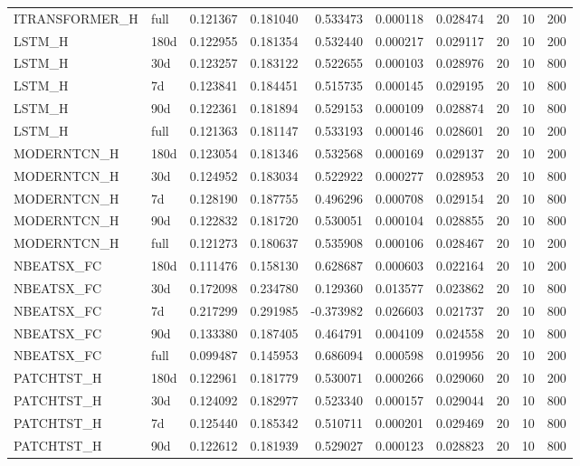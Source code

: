 \begin{tabular}{llrrrrrrrr}
ITRANSFORMER\_H & full & 0.121367 & 0.181040 & 0.533473 & 0.000118 & 0.028474 & 20 & 10 & 200 \\
LSTM\_H & 180d & 0.122955 & 0.181354 & 0.532440 & 0.000217 & 0.029117 & 20 & 10 & 200 \\
LSTM\_H & 30d & 0.123257 & 0.183122 & 0.522655 & 0.000103 & 0.028976 & 20 & 10 & 800 \\
LSTM\_H & 7d & 0.123841 & 0.184451 & 0.515735 & 0.000145 & 0.029195 & 20 & 10 & 800 \\
LSTM\_H & 90d & 0.122361 & 0.181894 & 0.529153 & 0.000109 & 0.028874 & 20 & 10 & 800 \\
LSTM\_H & full & 0.121363 & 0.181147 & 0.533193 & 0.000146 & 0.028601 & 20 & 10 & 200 \\
MODERNTCN\_H & 180d & 0.123054 & 0.181346 & 0.532568 & 0.000169 & 0.029137 & 20 & 10 & 200 \\
MODERNTCN\_H & 30d & 0.124952 & 0.183034 & 0.522922 & 0.000277 & 0.028953 & 20 & 10 & 800 \\
MODERNTCN\_H & 7d & 0.128190 & 0.187755 & 0.496296 & 0.000708 & 0.029154 & 20 & 10 & 800 \\
MODERNTCN\_H & 90d & 0.122832 & 0.181720 & 0.530051 & 0.000104 & 0.028855 & 20 & 10 & 800 \\
MODERNTCN\_H & full & 0.121273 & 0.180637 & 0.535908 & 0.000106 & 0.028467 & 20 & 10 & 200 \\
NBEATSX\_FC & 180d & 0.111476 & 0.158130 & 0.628687 & 0.000603 & 0.022164 & 20 & 10 & 200 \\
NBEATSX\_FC & 30d & 0.172098 & 0.234780 & 0.129360 & 0.013577 & 0.023862 & 20 & 10 & 800 \\
NBEATSX\_FC & 7d & 0.217299 & 0.291985 & -0.373982 & 0.026603 & 0.021737 & 20 & 10 & 800 \\
NBEATSX\_FC & 90d & 0.133380 & 0.187405 & 0.464791 & 0.004109 & 0.024558 & 20 & 10 & 800 \\
NBEATSX\_FC & full & 0.099487 & 0.145953 & 0.686094 & 0.000598 & 0.019956 & 20 & 10 & 200 \\
PATCHTST\_H & 180d & 0.122961 & 0.181779 & 0.530071 & 0.000266 & 0.029060 & 20 & 10 & 200 \\
PATCHTST\_H & 30d & 0.124092 & 0.182977 & 0.523340 & 0.000157 & 0.029044 & 20 & 10 & 800 \\
PATCHTST\_H & 7d & 0.125440 & 0.185342 & 0.510711 & 0.000201 & 0.029469 & 20 & 10 & 800 \\
PATCHTST\_H & 90d & 0.122612 & 0.181939 & 0.529027 & 0.000123 & 0.028823 & 20 & 10 & 800 \\

\end{tabular}
